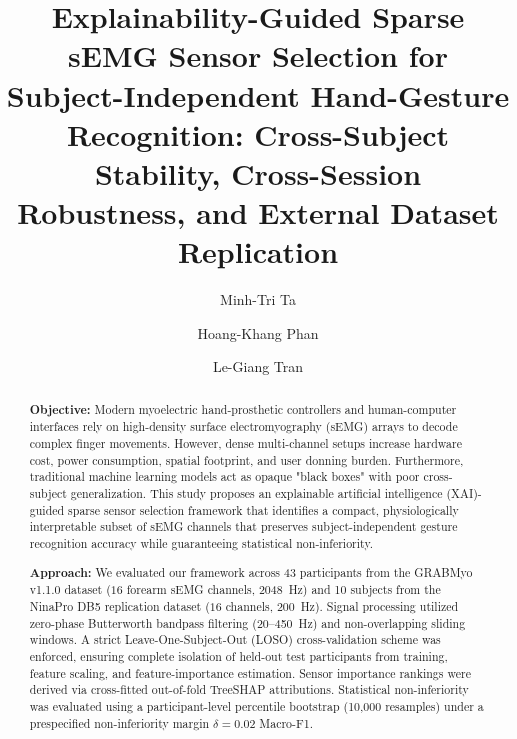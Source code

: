 \documentclass[final,5p,times,twocolumn]{elsarticle}
\begin{document}
\begin{frontmatter}

\title{Explainability-Guided Sparse sEMG Sensor Selection for Subject-Independent Hand-Gesture Recognition: Cross-Subject Stability, Cross-Session Robustness, and External Dataset Replication}

\author[inst1]{Minh-Tri Ta}
\author[inst2,inst3]{Hoang-Khang Phan}
\author[inst4]{Le-Giang Tran}



\begin{abstract}
\textbf{Objective:} Modern myoelectric hand-prosthetic controllers and human-computer interfaces rely on high-density surface electromyography (sEMG) arrays to decode complex finger movements. However, dense multi-channel setups increase hardware cost, power consumption, spatial footprint, and user donning burden. Furthermore, traditional machine learning models act as opaque "black boxes" with poor cross-subject generalization. This study proposes an explainable artificial intelligence (XAI)-guided sparse sensor selection framework that identifies a compact, physiologically interpretable subset of sEMG channels that preserves subject-independent gesture recognition accuracy while guaranteeing statistical non-inferiority.

\textbf{Approach:} We evaluated our framework across 43 participants from the GRABMyo v1.1.0 dataset ($16$ forearm sEMG channels, 2048~Hz) and 10 subjects from the NinaPro DB5 replication dataset ($16$ channels, 200~Hz). Signal processing utilized zero-phase Butterworth bandpass filtering (20--450~Hz) and non-overlapping sliding windows. A strict Leave-One-Subject-Out (LOSO) cross-validation scheme was enforced, ensuring complete isolation of held-out test participants from training, feature scaling, and feature-importance estimation. Sensor importance rankings were derived via cross-fitted out-of-fold TreeSHAP attributions. Statistical non-inferiority was evaluated using a participant-level percentile bootstrap (10,000 resamples) under a prespecified non-inferiority margin $\delta = 0.02$ Macro-F1.


\end{abstract}
\end{frontmatter}
\end{document}
